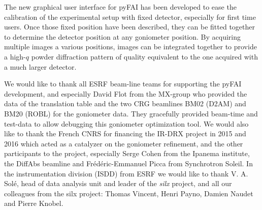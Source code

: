 \documentclass[preprint, pdf]{iucr}              %
\begin{document}
The new graphical user interface for pyFAI has been developed to ease the
calibration of the experimental setup with fixed detector, especially for first
time users.
Once those fixed position have been described, they can be fitted together to
determine the detector position at any goniometer position. 
By acquiring multiple images a various positions, images can be
integrated together to provide a high-$q$ powder diffraction pattern of
quality equivalent to the one acquired with a much larger detector. 

 

We would like to thank all ESRF beam-line teams for supporting the
pyFAI development, and especially David Flot from the MX-group who provided the
data of the translation table and the two CRG beamlines BM02 (D2AM) and BM20
(ROBL) for the goniometer data. 
They gracefully provided beam-time and test-data to allow debugging this 
goniometer optimization tool.
We would also like to thank the French CNRS for financing the IR-DRX project
in 2015 and 2016 which acted as a catalyzer on the goniometer refinement,
and the other participants to the project, especially Serge Cohen from the
Ipanema institute, the DiffAbs beamline and Frédéric-Emmanuel Picca from
Synchrotron Soleil.
In the instrumentation division (ISDD) from ESRF  we would like to thank V. A.
Solé, head of data analysis unit and leader of the \textit{silx} project, and all our
colleagues from the silx project: Thomas Vincent, Henri Payno, Damien Naudet and
Pierre Knobel.



\end{document}
